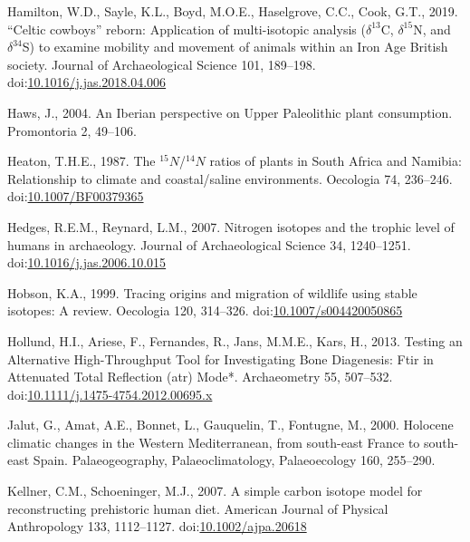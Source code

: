 \documentclass[review]{elsarticle} %
\newlength{\cslhangindent}
\newenvironment{CSLReferences}[2] %
 {%
  \setlength{\parindent}{0pt}
  \ifodd #1 \everypar{\setlength{\hangindent}{\cslhangindent}}\ignorespaces\fi
  \ifnum #2 > 0
  \setlength{\parskip}{#2\baselineskip}
  \fi
 }%
 {}
\begin{document}
\begin{CSLReferences}{1}{0}
\leavevmode{}%
Hamilton, W.D., Sayle, K.L., Boyd, M.O.E., Haselgrove, C.C., Cook, G.T., 2019. {``{Celtic} cowboys''} reborn: Application of multi-isotopic analysis ({\(\delta^{13}\)C}, {\(\delta^{15}\)N}, and {\(\delta^{34}\)S}) to examine mobility and movement of animals within an {Iron Age British} society. Journal of Archaeological Science 101, 189--198. doi:\href{https://doi.org/10.1016/j.jas.2018.04.006}{10.1016/j.jas.2018.04.006}

\leavevmode{}%
Haws, J., 2004. An {Iberian} perspective on {Upper Paleolithic} plant consumption. Promontoria 2, 49--106.

\leavevmode{}%
Heaton, T.H.E., 1987. The \(^{15}N\)/\(^{14}N\) ratios of plants in {South Africa} and {Namibia}: Relationship to climate and coastal/saline environments. Oecologia 74, 236--246. doi:\href{https://doi.org/10.1007/BF00379365}{10.1007/BF00379365}

\leavevmode{}%
Hedges, R.E.M., Reynard, L.M., 2007. Nitrogen isotopes and the trophic level of humans in archaeology. Journal of Archaeological Science 34, 1240--1251. doi:\href{https://doi.org/10.1016/j.jas.2006.10.015}{10.1016/j.jas.2006.10.015}

\leavevmode{}%
Hobson, K.A., 1999. Tracing origins and migration of wildlife using stable isotopes: A review. Oecologia 120, 314--326. doi:\href{https://doi.org/10.1007/s004420050865}{10.1007/s004420050865}

\leavevmode{}%
Hollund, H.I., Ariese, F., Fernandes, R., Jans, M.M.E., Kars, H., 2013. Testing an {Alternative High}-{Throughput Tool} for {Investigating Bone Diagenesis}: {Ftir} in {Attenuated Total Reflection} (atr) {Mode}*. Archaeometry 55, 507--532. doi:\href{https://doi.org/10.1111/j.1475-4754.2012.00695.x}{10.1111/j.1475-4754.2012.00695.x}

\leavevmode{}%
Jalut, G., Amat, A.E., Bonnet, L., Gauquelin, T., Fontugne, M., 2000. Holocene climatic changes in the {Western Mediterranean}, from south-east {France} to south-east {Spain}. Palaeogeography, Palaeoclimatology, Palaeoecology 160, 255--290.

\leavevmode{}%
Kellner, C.M., Schoeninger, M.J., 2007. A simple carbon isotope model for reconstructing prehistoric human diet. American Journal of Physical Anthropology 133, 1112--1127. doi:\href{https://doi.org/10.1002/ajpa.20618}{10.1002/ajpa.20618}


\end{CSLReferences}
\end{document}
